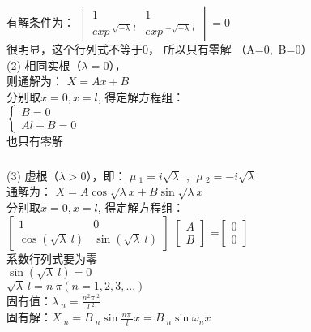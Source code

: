 \begin{frame}
\frametitle{}	
	有解条件为：
	$\begin{vmatrix}
		1&1\\
		exp~^{\sqrt{-\lambda}~l} &exp~^{-\sqrt{-\lambda}~l}
	\end{vmatrix}
	= 0$\\
	很明显，这个行列式不等于0， 所以只有零解 （A=0,~B=0）    \\ \vspace{0.3cm}
	(2) 相同实根（$\lambda = 0$），\\
	则通解为：	{ $\displaystyle 	X=Ax + B $ } \\ 
	分别取$x=0, x=l$, 得定解方程组：\\
	{$\displaystyle \left\{
	\begin{array}{lll}
		B=0\\
		Al+B=0
	\end{array} \right. $}\\
	也只有零解  \\
\end{frame}	

\begin{frame}
	\frametitle{}	
	(3) 虚根（$\lambda >0$），即： $ \mu~_1=i\sqrt{\lambda}~~,~~\mu~_2=-i\sqrt{\lambda}$	\\
	通解为：	{ $\displaystyle 	X=A\cos \sqrt{\lambda}x+ B\sin \sqrt{\lambda}x $ } \\ 
	分别取$x=0, x=l$, 得定解方程组：\\
	$\left[
	\begin{array}{lll}
		1&0\\
		\cos( {\sqrt{\lambda}~l}) &\sin ({\sqrt{\lambda}~l})
	\end{array}
	\right]$
	$\left[
	\begin{array}{ll}
		A\\
		B
	\end{array}
	\right]$
	=$\left[
	\begin{array}{ll}
		0\\
		0
	\end{array}
	\right]$\\ 
	系数行列式要为零\\
	$ \sin ({\sqrt{\lambda}~l})=0$ \\
	$ \sqrt{\lambda}~l=n~\pi  (n=1,2,3,...) $\\ 
	固有值：$\displaystyle  \lambda~_n=\frac{n^2\pi~^2}{l~^2}$ \\ 
	固有解：{\large $\displaystyle  X~_n=B~_n \sin \frac{n\pi~}{l} x=B~_n \sin \omega_n x $}
\end{frame}	

